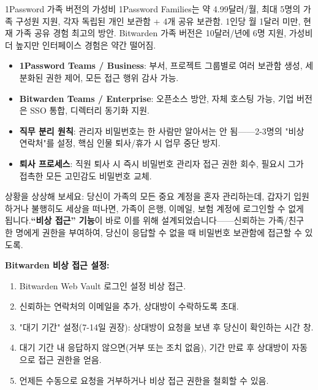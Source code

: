 \begin{tcbinfo}{1Password 가족 버전의 가성비}
1Password Families는 약 4.99달러/월, 최대 5명의 가족 구성원 지원, 각자 독립된 개인 보관함 + 4개 공유 보관함. 1인당 월 1달러 미만, 현재 가족 공유 경험 최고의 방안. Bitwarden 가족 버전은 10달러/년에 6명 지원, 가성비 더 높지만 인터페이스 경험은 약간 떨어짐.

\end{tcbinfo}


\begin{itemize}
  \item \textbf{1Password Teams / Business}: 부서, 프로젝트 그룹별로 여러 보관함 생성, 세분화된 권한 제어, 모든 접근 행위 감사 가능.
  \item \textbf{Bitwarden Teams / Enterprise}: 오픈소스 방안, 자체 호스팅 가능, 기업 버전은 SSO 통합, 디렉터리 동기화 지원.
  \item \textbf{직무 분리 원칙}: 관리자 비밀번호는 한 사람만 알아서는 안 됨——2-3명의 "비상 연락처"를 설정, 핵심 인물 퇴사/휴가 시 업무 중단 방지.
  \item \textbf{퇴사 프로세스}: 직원 퇴사 시 즉시 비밀번호 관리자 접근 권한 회수, 필요시 그가 접촉한 모든 고민감도 비밀번호 교체.
\end{itemize}


상황을 상상해 보세요: 당신이 가족의 모든 중요 계정을 혼자 관리하는데, 갑자기 입원하거나 불행히도 세상을 떠나면, 가족이 은행, 이메일, 보험 계정에 로그인할 수 없게 됩니다.\textbf{“비상 접근” 기능}이 바로 이를 위해 설계되었습니다——신뢰하는 가족/친구 한 명에게 권한을 부여하여, 당신이 응답할 수 없을 때 비밀번호 보관함에 접근할 수 있도록.

\textbf{Bitwarden 비상 접근 설정:}

\begin{enumerate}
  \item Bitwarden Web Vault 로그인 설정 비상 접근.
  \item 신뢰하는 연락처의 이메일을 추가, 상대방이 수락하도록 초대.
  \item "대기 기간" 설정(7-14일 권장): 상대방이 요청을 보낸 후 당신이 확인하는 시간 창.
  \item 대기 기간 내 응답하지 않으면(거부 또는 조치 없음), 기간 만료 후 상대방이 자동으로 접근 권한을 얻음.
  \item 언제든 수동으로 요청을 거부하거나 비상 접근 권한을 철회할 수 있음.
\end{enumerate}

